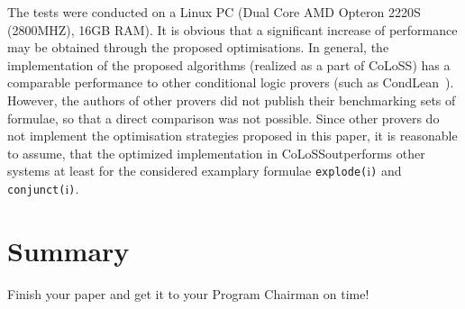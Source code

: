 \documentclass{entcs} \usepackage{entcsmacro}
\newcommand{\COLOSS}{{\textrm CoLoSS}}
\begin{document}
The tests were conducted on a Linux PC (Dual Core AMD Opteron 2220S (2800MHZ), 16GB RAM).
It is obvious that a significant increase of performance may be obtained through
the proposed optimisations. In general, the implementation of the proposed algorithms (realized
as a part of \COLOSS) has a comparable performance to
other conditional logic provers (such as CondLean~\cite{OlivettiEA07}). However, the authors of other
provers did not publish their benchmarking sets of formulae, so that a direct
comparison was not possible. Since other provers do not implement the optimisation
strategies proposed in this paper, it is reasonable to assume, that the optimized
implementation in \COLOSS outperforms other systems at least for the 
considered examplary formulae \verb|explode(|i\verb|)| and \verb|conjunct(|i\verb|)|.

\section{Summary}  
\begin{problem}
  Finish your paper and get it to your Program Chairman on time!
\end{problem}



\end{document}
